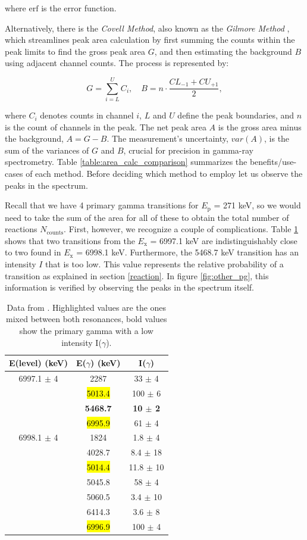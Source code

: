\documentclass[a4paper,12pt]{article}
\begin{document}
where $\text{erf}$ is the error function.  

Alternatively, there is the \textit{Covell Method}, also known as the \textit{Gilmore Method} \cite{gilmore2008}, which streamlines peak area calculation by first summing the counts within the peak limits to find the gross peak area \( G \), and then estimating the background \( B \) using adjacent channel counts. The process is represented by:

\[
G = \sum_{i=L}^{U} C_i, \quad B = n \cdot \frac{CL_{-1} + CU_{+1}}{2},
\]

where \( C_i \) denotes counts in channel \( i \), \( L \) and \( U \) define the peak boundaries, and \( n \) is the count of channels in the peak. The net peak area \( A \) is the gross area minus the background, \( A = G - B \). The measurement's uncertainty, \( var(A) \), is the sum of the variances of \( G \) and \( B \), crucial for precision in gamma-ray spectrometry. Table \ref{table:area_calc_comparison} summarizes the benefits/use-cases of each method.  Before deciding which method to employ let us observe the peaks in the spectrum.  

Recall that we have 4 primary gamma transitions for $E_{\text{p}}$ = 271 keV, so we would need to take the sum of the area for all of these to obtain the total number of reactions $N_{\text{counts}}$.  First, however, we recognize a couple of complications.  Table \ref{tab:nndc} shows that two transitions from the $E_{\text{x}}$ = 6997.1 keV are indistinguishably close to two found in $E_{\text{x}}$ = 6998.1 keV.  Furthermore, the 5468.7 keV transition has an intensity $I$ that is too low.  This value represents the relative probability of a transition as explained in section \ref{reaction}. In figure \ref{fig:other_pg}, this information is verified by observing the peaks in the spectrum itself.  

\begin{table}[H]
\centering
\begin{tabular}{||c|c|c||}
\hline
\textbf{E(level) (keV)} & \textbf{E($\gamma$) (keV)} & \textbf{I($\gamma$)} \\
\hline
6997.1 $\pm$ 4 & 2287 & 33 $\pm$ 4 \\
& \hl{5013.4} & 100 $\pm$ 6 \\
& \textbf{5468.7} & \textbf{10 $\pm$ 2} \\
& \hl{6995.9} & 61 $\pm$ 4 \\
\hline
6998.1 $\pm$ 4 & 1824 & 1.8 $\pm$ 4 \\
& 4028.7 & 8.4 $\pm$ 18 \\
& \hl{5014.4} & 11.8 $\pm$ 10 \\
& 5045.8 & 58 $\pm$ 4 \\
& 5060.5 & 3.4 $\pm$ 10 \\
& 6414.3 & 3.6 $\pm$ 8 \\
& \hl{6996.9} & 100 $\pm$ 4 \\
\hline
\end{tabular}
\caption{Data from \cite{NNDCNuDat22Na}. Highlighted values are the ones mixed between both resonances, bold values show the primary gamma with a low intensity I($\gamma$).}
\label{tab:nndc}
\end{table}
\end{document}
